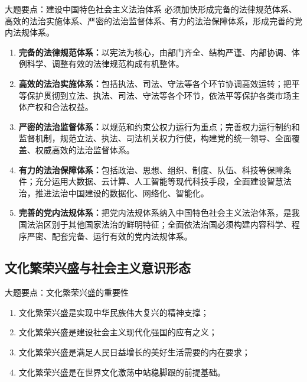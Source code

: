 \documentclass[12pt,a4paper]{ctexart}
\begin{document}
\begin{greenlinebox}{大题要点：建设中国特色社会主义法治体系}
必须加快形成完备的法律规范体系、高效的法治实施体系、严密的法治监督体系、有力的法治保障体系，形成完善的党内法规体系。
\begin{enumerate}
  \item \textbf{完备的法律规范体系：}以宪法为核心，由部门齐全、结构严谨、内部协调、体例科学、调整有效的法律规范构成有机整体。
  \item \textbf{高效的法治实施体系：}包括执法、司法、守法等各个环节协调高效运转；把平等保护贯彻到立法、执法、司法、守法等各个环节，依法平等保护各类市场主体产权和合法权益。
  \item \textbf{严密的法治监督体系：}以规范和约束公权力运行为重点；完善权力运行制约和监督机制，规范立法、执法、司法机关权力行使，构建党的统一领导、全面覆盖、权威高效的法治监督体系。
  \item \textbf{有力的法治保障体系：}包括政治、思想、组织、制度、队伍、科技等保障条件；充分运用大数据、云计算、人工智能等现代科技手段，全面建设智慧法治，推进法治中国建设的数据化、网络化、智能化。
  \item \textbf{完善的党内法规体系：}把党内法规体系纳入中国特色社会主义法治体系，是我国法治区别于其他国家法治的鲜明特征；全面依法治国必须构建内容科学、程序严密、配套完备、运行有效的党内法规体系。
\end{enumerate}
\end{greenlinebox}

\subsection{文化繁荣兴盛与社会主义意识形态}

\begin{greenlinebox}{大题要点：文化繁荣兴盛的重要性}
\begin{enumerate}
  \item 文化繁荣兴盛是实现中华民族伟大复兴的精神支撑；
  \item 文化繁荣兴盛是建设社会主义现代化强国的应有之义；
  \item 文化繁荣兴盛是满足人民日益增长的美好生活需要的内在要求；
  \item 文化繁荣兴盛是在世界文化激荡中站稳脚跟的前提基础。
\end{enumerate}
\end{greenlinebox}
\end{document}
